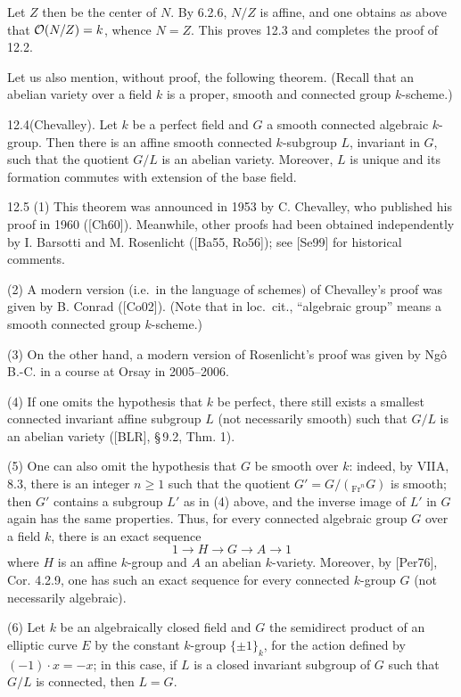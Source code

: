 Let $Z$ then be the center of $N$. By 6.2.6, $N/Z$ is affine, and one obtains as above that $\mathcal{O}(N/Z)=k$, whence $N=Z$. This proves 12.3 and completes the proof of 12.2.

Let us also mention, without proof, the following theorem. (Recall that an abelian variety over a field $k$ is a proper, smooth and connected group $k$-scheme.)
\begin{theorem}{12.4}\label{VIB.12.4}\textup{(Chevalley).}
Let $k$ be a perfect field and $G$ a smooth connected algebraic $k$-group. Then there is an affine smooth connected $k$-subgroup $L$, invariant in $G$, such that the quotient $G/L$ is an abelian variety. Moreover, $L$ is unique and its formation commutes with extension of the base field.
\end{theorem}

\begin{remarks}{12.5}\label{VIB.12.5}
(1) This theorem was announced in 1953 by C. Chevalley, who published his proof in 1960 ([Ch60]). Meanwhile, other proofs had been obtained independently by I. Barsotti and M. Rosenlicht ([Ba55, Ro56]); see [Se99] for historical comments.

(2) A modern version (i.e.\ in the language of schemes) of Chevalley's proof was given by B. Conrad ([Co02]). (Note that in loc.\ cit., ``algebraic group'' means a smooth connected group $k$-scheme.)

(3) On the other hand, a modern version of Rosenlicht's proof was given by Ngô B.-C. in a course at Orsay in 2005–2006.

(4) If one omits the hypothesis that $k$ be perfect, there still exists a smallest connected invariant affine subgroup $L$ (not necessarily smooth) such that $G/L$ is an abelian variety ([BLR], \S\,9.2, Thm. 1).

(5) One can also omit the hypothesis that $G$ be smooth over $k$: indeed, by VIIA, 8.3, there is an integer $n\geq1$ such that the quotient $G'=G/({}_{\mathrm{Fr}^n}G)$ is smooth; then $G'$ contains a subgroup $L'$ as in (4) above, and the inverse image of $L'$ in $G$ again has the same properties. Thus, for every connected algebraic group $G$ over a field $k$, there is an exact sequence
\[
1\to H\to G\to A\to1
\]
where $H$ is an affine $k$-group and $A$ an abelian $k$-variety. Moreover, by [Per76], Cor. 4.2.9, one has such an exact sequence for every connected $k$-group $G$ (not necessarily algebraic).

(6) Let $k$ be an algebraically closed field and $G$ the semidirect product of an elliptic curve $E$ by the constant $k$-group $\{\pm1\}_k$, for the action defined by $(-1)\cdot x=-x$; in this case, if $L$ is a closed invariant subgroup of $G$ such that $G/L$ is connected, then $L=G$.
\end{remarks}

